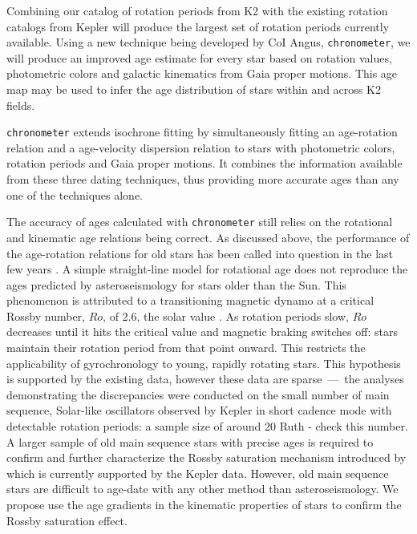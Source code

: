 \documentclass[12pt]{article}
\newcommand{\racomment}[1]{{\color{red}#1}}
\begin{document}
Combining our catalog of rotation periods from K2 with the existing rotation
catalogs from Kepler will produce the largest set of rotation periods
currently available.
Using a new technique being developed by CoI Angus, {\tt chronometer}, we
will produce an improved age estimate for every star based on rotation values,
photometric colors and galactic kinematics from Gaia proper motions.
This age map may be used to infer the age distribution of stars within and
across K2 fields.

{\tt chronometer} extends isochrone fitting by simultaneously fitting an
age-rotation relation and a age-velocity dispersion relation to stars with
photometric colors, rotation periods and Gaia proper motions.
It combines the information available from these three dating techniques, thus
providing more accurate ages than any one of the techniques alone.

The accuracy of ages calculated with {\tt chronometer} still relies on the
rotational and kinematic age relations being correct.
As discussed above, the performance of the age-rotation relations for old
stars has been called into question in the last few years \citep{Angus2015,
Vansaders2016, Metcalfe2016}.
A simple straight-line model for rotational age does not reproduce the ages
predicted by asteroseismology for stars older than the Sun.
This phenomenon is attributed to a transitioning magnetic dynamo at a critical
Rossby number, $Ro$, of 2.6, the solar value \citep{van-saders2016}.
As rotation periods slow, $Ro$ decreases until it hits the critical value and
magnetic braking switches off: stars maintain their rotation period from that
point onward.
This restricts the applicability of gyrochronology to young, rapidly rotating
stars.
This hypothesis is supported by the existing data, however these data are
sparse~---~the analyses demonstrating the discrepancies were conducted on the
small number of main sequence, Solar-like oscillators observed by Kepler in
short cadence mode with detectable rotation periods: a sample size of around
20 \racomment{Ruth - check this number}.
A larger sample of old main sequence stars with precise ages is required to
confirm and further characterize the Rossby saturation mechanism introduced by
\citep{Vansaders2016} which is currently supported by the Kepler data.
However, old main sequence stars are difficult to age-date with any other
method than asteroseismology.
We propose use the age gradients in the kinematic properties of stars to
confirm the Rossby saturation effect.
\end{document}
